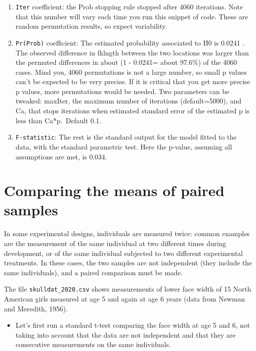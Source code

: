 \documentclass[
  12pt,
]{book}
\providecommand{\tightlist}{%
  \setlength{\itemsep}{0pt}\setlength{\parskip}{0pt}}
\begin{document}
\begin{enumerate}
\def\labelenumi{\arabic{enumi}.}
\tightlist
\item
  \texttt{Iter} coefficient: the Prob stopping rule stopped after 4060 iterations. Note that this number will vary each time you run this snippet of code. These are random permutation results, so expect variability.
\item
  \texttt{Pr(Prob)} coefficient: The estimated probability associated to H0 is 0.0241 . The observed difference in fklngth between the two locations was larger than the permuted differences in about (1 - 0.0241= about 97.6\%) of the 4060 cases. Mind you, 4060 permutations is not a large number, so small p values can't be expected to be very precise. If it is critical that you get more precise p values, more permutations would be needed. Two parameters can be tweaked: maxIter, the maximum number of iterations (default=5000), and Ca, that stops iterations when estimated standard error of the estimated p is less than Ca*p.~Default 0.1.
\item
  \texttt{F-statistic}: The rest is the standard output for the model fitted to the data, with the standard parametric test. Here the p-value, assuming all assumptions are met, is 0.034.
\end{enumerate}

\hypertarget{comparing-the-means-of-paired-samples}{%
\section{Comparing the means of paired samples}\label{comparing-the-means-of-paired-samples}}

In some experimental designs, individuals are measured twice: common examples are the measurement of the same individual at two different times during development, or of the same individual subjected to two different experimental treatments. In these cases, the two samples are not independent (they include the same individuals), and a paired comparison must be made.

The file \texttt{skulldat\_2020.csv} shows measurements of lower face width of 15 North American girls measured at age 5 and again at age 6 years (data from Newman and Meredith, 1956).

\begin{itemize}
\tightlist
\item
  Let's first run a standard t-test comparing the face width at age 5 and 6, not taking into account that the data are not independent and that they are consecutive measurements on the same individuals.
\end{itemize}
\end{document}
